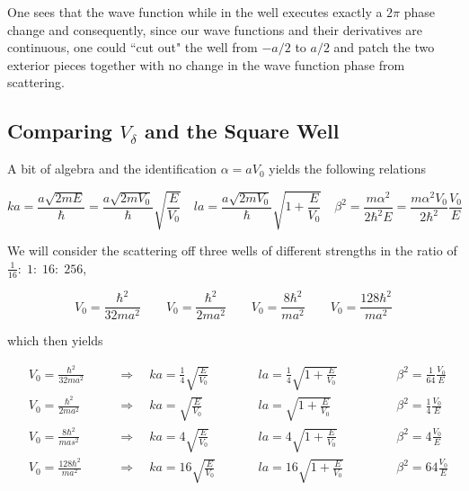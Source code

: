 One sees that the wave function while in the well executes exactly
a   $2\pi$  phase change and consequently, since our wave functions and their
derivatives are continuous, one could “cut out" the well from  $-a/2$  to  $a/
2$ and patch the two exterior pieces together with no change in the wave function
phase from scattering.



\subsection{Comparing  $V_\delta$ and the Square Well} 

A bit of algebra and the identification $\alpha = aV_0$ yields the following
relations

\[
ka = \frac{a\sqrt{2mE}}{\hbar}
= \frac{a\sqrt{2mV_0}}{\hbar}\sqrt{\frac{E}{V_0}} \quad la
= \frac{a\sqrt{2mV_0}}{\hbar} \sqrt{1+\frac{E}{V_0}} \quad \beta^2
= \frac{m\alpha^2}{2\hbar^2 E} = \frac{m\alpha^2V_0}{2\hbar^2}\frac{V_0}{E}
\] \vspace{3px}

We will consider the scattering off three wells of different strengths in the
ratio of $\frac{1}{16}: \; 1: \; 16: \; 256$, 

\[
V_0 = \frac{\hbar^2}{32ma^2} \qquad V_0 = \frac{\hbar^2}{2ma^2} \qquad V_0
= \frac{8\hbar^2}{ma^2} \qquad V_0 = \frac{128\hbar^2}{ma^2}
\] \vspace{3px}

which then yields

\begin{align} \label{}
  &V_0 = \frac{\hbar^2}{32ma^2} &&\quad \Rightarrow \quad ka = \frac{1}{4}\sqrt{\frac{E}{V_0}}
  &&&\quad la = \frac{1}{4}\sqrt{1 + \frac{E}{V_0}} &&&&\quad \beta^2
  = \frac{1}{64}\frac{V_0}{E} \\ 
  &V_0 = \frac{\hbar^2}{2ma^2} &&\quad \Rightarrow \quad ka
  = \sqrt{\frac{E}{V_0}} &&&\quad la = \sqrt{1 + \frac{E}{V_0}} &&&&\quad
  \beta^2 = \frac{1}{4}\frac{V_0}{E} \\ 
  &V_0 = \frac{8\hbar^2}{mas^2} &&\quad \Rightarrow \quad ka
  = 4\sqrt{\frac{E}{V_0}} &&&\quad la = 4\sqrt{1 + \frac{E}{V_0}} &&&&\quad
  \beta^2 = 4\frac{V_0}{E} \\
                          &V_0 = \frac{128\hbar^2}{ma^2} &&\quad \Rightarrow
  \quad ka = 16\sqrt{\frac{E}{V_0}} &&&\quad la = 16\sqrt{1+ \frac{E}{V_0}}
                                    &&&&\quad \beta^2 = 64\frac{V_0}{E}
\end{align}\vspace{3px}


